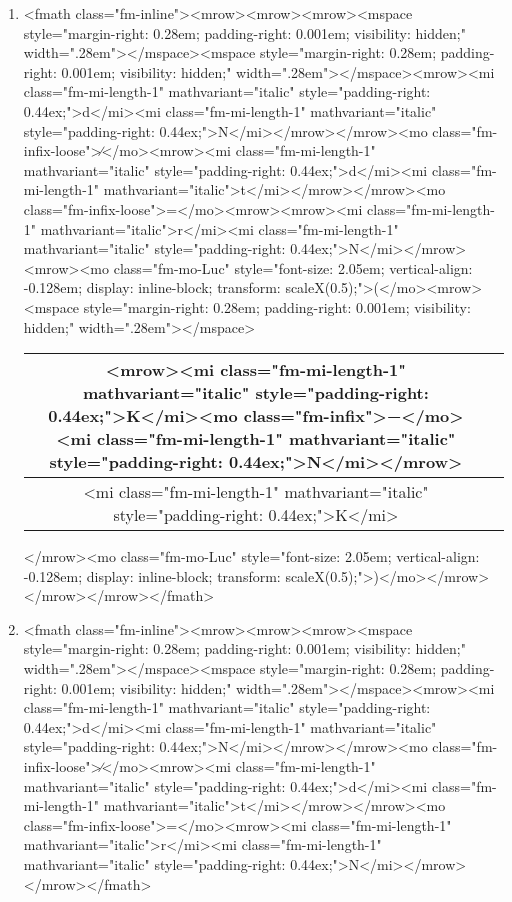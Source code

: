 \documentclass{article}
\begin{document}
\begin{enumerate}[label=(\alph*)]
\item  <fmath class="fm-inline"><mrow><mrow><mrow><mspace style="margin-right: 0.28em; padding-right: 0.001em; visibility: hidden;" width=".28em">‌</mspace><mspace style="margin-right: 0.28em; padding-right: 0.001em; visibility: hidden;" width=".28em">‌</mspace><mrow><mi class="fm-mi-length-1" mathvariant="italic" style="padding-right: 0.44ex;">d</mi><mi class="fm-mi-length-1" mathvariant="italic" style="padding-right: 0.44ex;">N</mi></mrow></mrow><mo class="fm-infix-loose">∕</mo><mrow><mi class="fm-mi-length-1" mathvariant="italic" style="padding-right: 0.44ex;">d</mi><mi class="fm-mi-length-1" mathvariant="italic">t</mi></mrow></mrow><mo class="fm-infix-loose">=</mo><mrow><mrow><mi class="fm-mi-length-1" mathvariant="italic">r</mi><mi class="fm-mi-length-1" mathvariant="italic" style="padding-right: 0.44ex;">N</mi></mrow><mrow><mo class="fm-mo-Luc" style="font-size: 2.05em; vertical-align: -0.128em; display: inline-block; transform: scaleX(0.5);">(</mo><mrow><mspace style="margin-right: 0.28em; padding-right: 0.001em; visibility: hidden;" width=".28em">‌</mspace>\begin{tabular}{|c|c|}
\hline
<mrow><mi class="fm-mi-length-1" mathvariant="italic" style="padding-right: 0.44ex;">K</mi><mo class="fm-infix">−</mo><mi class="fm-mi-length-1" mathvariant="italic" style="padding-right: 0.44ex;">N</mi></mrow> \\
\hline
<mi class="fm-mi-length-1" mathvariant="italic" style="padding-right: 0.44ex;">K</mi> \\
\hline
\end{tabular}
</mrow><mo class="fm-mo-Luc" style="font-size: 2.05em; vertical-align: -0.128em; display: inline-block; transform: scaleX(0.5);">)</mo></mrow></mrow></mrow></fmath>
\item  <fmath class="fm-inline"><mrow><mrow><mrow><mspace style="margin-right: 0.28em; padding-right: 0.001em; visibility: hidden;" width=".28em">‌</mspace><mspace style="margin-right: 0.28em; padding-right: 0.001em; visibility: hidden;" width=".28em">‌</mspace><mrow><mi class="fm-mi-length-1" mathvariant="italic" style="padding-right: 0.44ex;">d</mi><mi class="fm-mi-length-1" mathvariant="italic" style="padding-right: 0.44ex;">N</mi></mrow></mrow><mo class="fm-infix-loose">∕</mo><mrow><mi class="fm-mi-length-1" mathvariant="italic" style="padding-right: 0.44ex;">d</mi><mi class="fm-mi-length-1" mathvariant="italic">t</mi></mrow></mrow><mo class="fm-infix-loose">=</mo><mrow><mi class="fm-mi-length-1" mathvariant="italic">r</mi><mi class="fm-mi-length-1" mathvariant="italic" style="padding-right: 0.44ex;">N</mi></mrow></mrow></fmath>

\end{enumerate}
\end{document}
